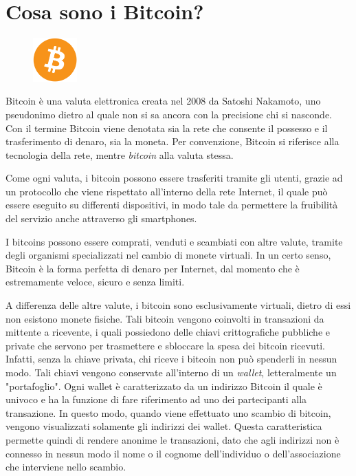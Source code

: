 \section{Cosa sono i Bitcoin?}

\begin{figure}
	\vspace{-20pt}
	\includegraphics[width=0.15\textwidth]{figure/btcicon}
\end{figure}

Bitcoin è una valuta elettronica creata nel 2008 da Satoshi Nakamoto, uno pseudonimo dietro al quale non si sa ancora con la precisione chi si nasconde.
Con il termine Bitcoin viene denotata sia la rete che consente il possesso e il trasferimento di denaro, sia la moneta. Per convenzione, Bitcoin si riferisce alla tecnologia della rete, mentre \textit{bitcoin} alla valuta stessa.\cite{wiki:bitcoin}

Come ogni valuta, i bitcoin possono essere trasferiti tramite gli utenti, grazie ad un protocollo che viene rispettato all'interno della rete Internet, il quale può essere eseguito su differenti dispositivi, in modo tale da permettere la fruibilità del servizio anche attraverso gli smartphones.
 
I bitcoins possono essere comprati, venduti e scambiati con altre valute, tramite degli organismi specializzati nel cambio di monete virtuali. In un certo senso, Bitcoin è la forma perfetta di denaro per Internet, dal momento che è estremamente veloce, sicuro e senza limiti.

A differenza delle altre valute, i bitcoin sono esclusivamente virtuali, dietro di essi non esistono monete fisiche. Tali bitcoin vengono coinvolti in transazioni da mittente a ricevente, i quali possiedono delle chiavi crittografiche pubbliche e private che servono per trasmettere e sbloccare la spesa dei bitcoin ricevuti.
Infatti, senza la chiave privata, chi riceve i bitcoin non può spenderli in nessun modo. Tali chiavi vengono conservate all'interno di un \textit{wallet}, letteralmente un "portafoglio". Ogni wallet è caratterizzato da un indirizzo Bitcoin il quale è univoco e ha la funzione di fare riferimento ad uno dei partecipanti alla transazione. In questo modo, quando viene effettuato uno scambio di bitcoin, vengono visualizzati solamente gli indirizzi dei wallet. Questa caratteristica permette quindi di rendere anonime le transazioni, dato che agli indirizzi non è connesso in nessun modo il nome o il cognome dell'individuo o dell'associazione che interviene nello scambio.

